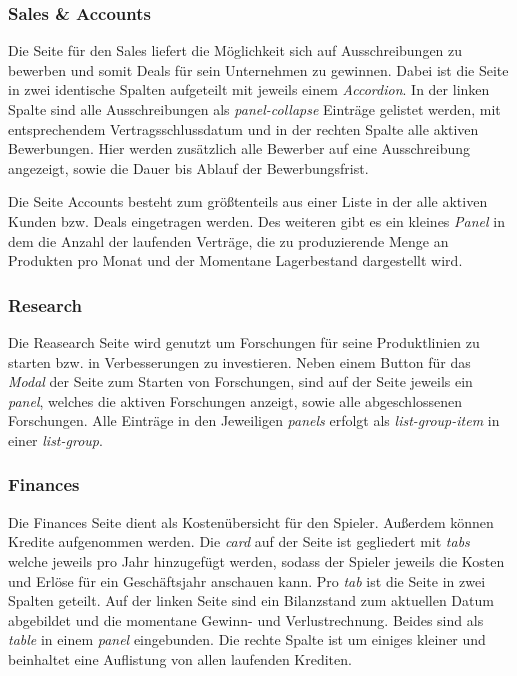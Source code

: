 \subsubsection{Sales \& Accounts}
Die Seite für den Sales liefert die Möglichkeit sich auf Ausschreibungen zu bewerben und somit Deals für sein Unternehmen zu gewinnen. Dabei ist die Seite in zwei identische Spalten aufgeteilt mit jeweils einem \textit{Accordion}. In der linken Spalte sind alle Ausschreibungen als \textit{panel-collapse} Einträge gelistet werden, mit entsprechendem Vertragsschlussdatum und in der rechten Spalte alle aktiven Bewerbungen. Hier werden zusätzlich alle Bewerber auf eine Ausschreibung angezeigt, sowie die Dauer bis Ablauf der Bewerbungsfrist.
\par Die Seite Accounts besteht zum größtenteils aus einer Liste in der alle aktiven Kunden bzw. Deals eingetragen werden. Des weiteren gibt es ein kleines \textit{Panel} in dem die Anzahl der laufenden Verträge, die zu produzierende Menge an Produkten pro Monat und der Momentane Lagerbestand dargestellt wird.

\subsubsection{Research}
Die Reasearch Seite wird genutzt um Forschungen für seine Produktlinien zu starten bzw. in Verbesserungen zu investieren. Neben einem Button für das \textit{Modal} der Seite zum Starten von Forschungen, sind auf der Seite jeweils ein \textit{panel}, welches die aktiven Forschungen anzeigt, sowie alle abgeschlossenen Forschungen. Alle Einträge in den Jeweiligen \textit{panels} erfolgt als \textit{list-group-item} in einer \textit{list-group}.

\subsubsection{Finances}
Die Finances Seite dient als Kostenübersicht für den Spieler. Außerdem können Kredite aufgenommen werden. Die \textit{card} auf der Seite ist gegliedert mit \textit{tabs} welche jeweils pro Jahr hinzugefügt werden, sodass der Spieler jeweils die Kosten und Erlöse für ein Geschäftsjahr anschauen kann. Pro \textit{tab} ist die Seite in zwei Spalten geteilt. Auf der linken Seite sind ein Bilanzstand zum aktuellen Datum abgebildet und die momentane Gewinn- und Verlustrechnung. Beides sind als \textit{table} in einem \textit{panel} eingebunden. Die rechte Spalte ist um einiges kleiner und beinhaltet eine Auflistung von allen laufenden Krediten.

